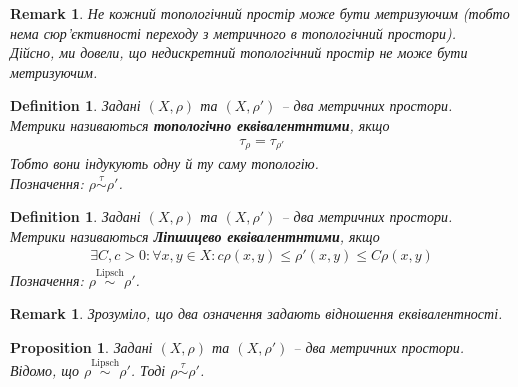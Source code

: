 \documentclass[a4paper, 10pt]{article}
\theoremstyle{theoremdd}
\newtheorem{definition}[theorem]{Definition}
\newtheorem{proposition}[theorem]{Proposition}
\newtheorem{remark}[theorem]{Remark}
\begin{document}
\begin{remark}
Не кожний топологічний простір може бути метризуючим (тобто нема сюр'єктивності переходу з метричного в топологічний простори).\\
Дійсно, ми довели, що недискретний топологічний простір не може бути метризуючим.
\end{remark}

\begin{definition}
Задані $(X,\rho)$ та $(X,\rho')$ -- два метричних простори.\\
Метрики називаються \textbf{топологічно еквівалентнтими}, якщо
\begin{align*}
\tau_\rho = \tau_{\rho'}
\end{align*}
Тобто вони індукують одну й ту саму топологію.\\
Позначення: $\rho \overset{\tau}{\sim} \rho'$.
\end{definition}

\begin{definition}
Задані $(X,\rho)$ та $(X,\rho')$ -- два метричних простори.\\
Метрики називаються \textbf{Ліпшицево еквівалентнтими}, якщо
\begin{align*}
\exists C, c > 0: \forall x,y \in X: c \rho(x,y) \leq \rho'(x,y) \leq C \rho(x,y)
\end{align*}
Позначення: $\rho \overset{\text{Lipsch}}{\sim} \rho'$.
\end{definition}

\begin{remark}
Зрозуміло, що два означення задають відношення еквівалентності.
\end{remark}

\begin{proposition}
Задані $(X,\rho)$ та $(X,\rho')$ -- два метричних простори. Відомо, що $\rho \overset{\text{Lipsch}}{\sim} \rho'$. Тоді $\rho \overset{\tau}{\sim} \rho'$.
\end{proposition}
\end{document}
